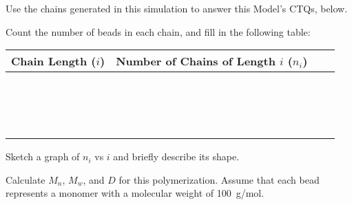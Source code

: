 \begin{activity}
\begin{model}
	Use the chains generated in this simulation to answer this Model's CTQs, below.

\end{model}
	
\begin{ctqs}

	\question Count the number of beads in each chain, and fill in the following table: \label{\labelbase:ctq:numbeadsstep}
		
		\begin{center}
		\renewcommand{\arraystretch}{2}
			\begin{tabular}{|c|c|c|c|}
				\hline
				\textbf{Chain Length ($i$)} & \textbf{Number of Chains of Length $i$  ($n_i$)} & \hspace{0.75in} & \hspace{0.75in} \\\hline
				&&&\\\hline
				&&&\\\hline
				&&&\\\hline
				&&&\\\hline
				&&&\\\hline
				&&&\\\hline
				&&&\\\hline
				&&&\\\hline
				&&&\\\hline
				&&&\\\hline
				&&&\\\hline
				&&&\\\hline
				&&&\\\hline
				&&&\\\hline
				&&&\\\hline
				&&&\\\hline
			\end{tabular}
		\end{center}
		
	\question Sketch a graph of $n_i$ vs $i$ and briefly describe its shape. \label{\labelbase:ctq:MWDstep}
	
		\begin{solution}[3in]
		\end{solution}
	
	\question Calculate $M_n$, $M_w$, and $D$ for this polymerization.  Assume that each bead represents a monomer with a molecular weight of 100~g/mol. \label{\labelbase:ctq:Dstep}
	
		\begin{solution}[3in]
		\end{solution}
	

\end{ctqs}
\end{activity}

